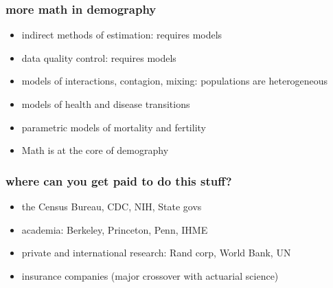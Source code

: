 \documentclass[20pt]{beamer}
\begin{document}
\begin{frame}
\frametitle{more math in demography}
\begin{itemize}[<+->]
  \item indirect methods of estimation: requires models
  \item data quality control: requires models
  \item models of interactions, contagion, mixing: populations are heterogeneous
  \item models of health and disease transitions
  \item parametric models of mortality and fertility
  \item Math is at the core of demography
\end{itemize}
\end{frame}

\begin{frame}
\frametitle{where can you get paid to do this stuff?}
\begin{itemize}[<+->]
  \item the Census Bureau, CDC, NIH, State govs
  \item academia: Berkeley, Princeton, Penn, IHME
  \item private and international research: Rand corp, World Bank, UN
  \item insurance companies (major crossover with actuarial science)
\end{itemize}
\color{mygray}{feel free to inquire about coming to Rostock, Germany to geek out
in mathematical demography}
\end{frame}
\end{document}
